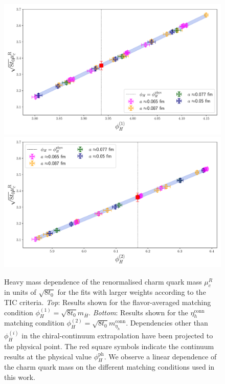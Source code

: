  \begin{figure}
 	\centering
 	\includegraphics[scale=0.5]{./cap6/figs/mc/fit_phih_interp_muc_fl_ave.pdf}
 	\includegraphics[scale=0.5]{./cap6/figs/mc/fit_phih_interp_muc_etac.pdf}
 	\caption{ Heavy mass dependence of the renormalised charm quark mass $\mu_c^{R}$ in units of $\sqrt{8t_0}$ for the fits with larger weights according to the TIC criteria. \textit{Top}: Results shown for the flavor-averaged matching condition $\phi_{H}^{(1)} = \sqrt{8t_0} m_{\overline{H}}$. \textit{Bottom}: Results shown for the $\eta_h^{\mathrm{conn}}$ matching condition $\phi_{H}^{(2)} = \sqrt{8t_0} m_{\eta_h}^{\mathrm{conn}}$. Dependencies other than $\phi_H^{(i)}$ in the chiral-continuum extrapolation have been projected to the physical point. The red square symbols indicate the continuum results at the physical value $\phi_H^{\mathrm{ph}}$. We observe a linear dependence of the charm quark mass on the different matching conditions used in this work. }
 	\label{fig:mc_mh_dependence}
 \end{figure}

